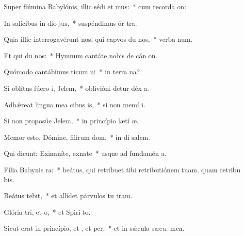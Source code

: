 \item Super flúmina Babylónis, illic sédi et mus:~* cum recorda on:
\item In salícibus in dio jus,~* suspéndimus ór tra.
\item Quia illic interrogavérunt nos, qui capvos du nos,~* verba num.
\item Et qui du nos:~* Hymnum cantáte nobis de cán on.
\item Quómodo cantábimus ticum ni~* in terra na?
\item Si oblítus fúero i, Jelem,~* oblivióni detur déx a.
\item Adhǽreat lingua mea cibus is,~* si non memí i.
\item Si non proposúe Jelem,~* in princípio lætí æ.
\item Memor esto, Dómine, filirum dom,~* in di salem.
\item Qui dicunt: Exinaníte, exnate~* usque ad fundamén  a.
\item Fília Babynis ra:~* beátus, qui retríbuet tibi retributiónem tuam, quam retribu bis.
\item Beátus  tebit,~* et allídet párvulos tu  tram.
\item Glória tri, et o,~* et Spirí to.
\item Sicut erat in princípio, et , et per,~* et in sǽcula sæcu. men.
